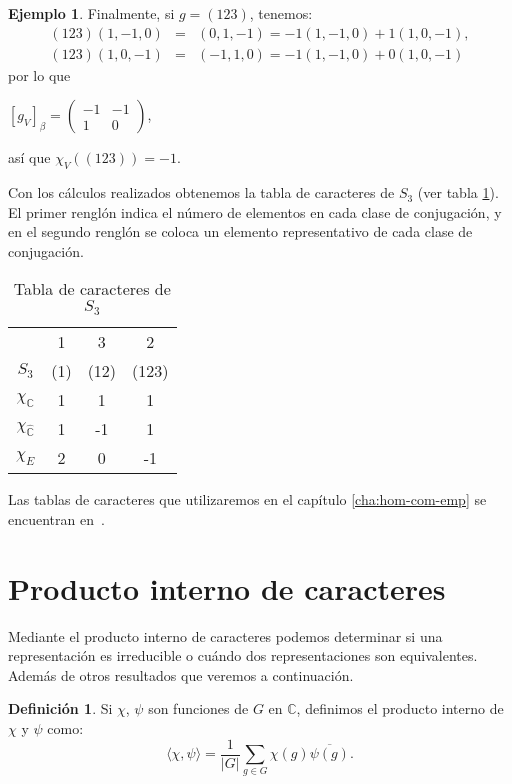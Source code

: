 \documentclass[12pt]{book}
\theoremstyle{definition}
\newtheorem{definition}[theorem]{Definición}
\newtheorem{example}[theorem]{Ejemplo}
\newcounter{in}
\newcounter{ini}
\begin{document}
\begin{example}
Finalmente, si $g=(123)$, tenemos:
\begin{eqnarray*}
  (123)(1,-1,0)&=&(0,1,-1)=-1(1,-1,0)+1(1,0,-1),\\
  (123)(1,0,-1)&=&(-1,1,0)=-1(1,-1,0)+0(1,0,-1)
\end{eqnarray*} 
por lo que 
\begin{center}
  $[g_{V}]_{\beta}=
  \begin{pmatrix}
    -1 & -1 \\
    1 & 0 
  \end{pmatrix}$,
\end{center}
así que $\chi_{V}((123))=-1$.

Con los cálculos realizados obtenemos la tabla de caracteres de
$S_{3}$ (ver tabla \ref{tabla-car-S3}). El primer renglón indica el
número de elementos en cada clase de conjugación, y en el segundo
renglón se coloca un elemento representativo de cada clase de
conjugación.
\begin{table}[htpb]
  \centering
  \begin{tabular}{ c| c c c}
      & 1 & 3 & 2 \\
      $S_{3}$ & (1) & (12) & (123) \\
      \hline
      $\chi_{\mathbb{C}}$ & 1 & 1 & 1 \\
      $\chi_{\mathbb{\hat C}}$ & 1 & -1 & 1 \\
      $\chi_{E}$ & 2 & 0 & -1 
    \end{tabular}
    
  \caption{Tabla de caracteres de $S_{3}$}
  \label{tabla-car-S3}
\end{table}

Las tablas de caracteres que utilizaremos en el capítulo
\ref{cha:hom-com-emp} se encuentran en~\cite{liebeck}.
\end{example}

\section{Producto interno de caracteres}
\label{producto-interno}


Mediante el producto interno de caracteres  podemos determinar si una
representación es irreducible o cuándo dos representaciones son
equivalentes. Además de otros resultados que veremos a continuación.
\begin{definition}
  Si $\chi$, $\psi$ son funciones de $G$ en $\mathbb{C}$, definimos el
  producto interno de $\chi$ y $\psi$ como:
  \begin{equation*}
    \langle\chi,\psi\rangle=\frac{1}{|G|}\sum_{g\in G}\chi(g)\overline{\psi(g)}.
  \end{equation*}
\end{definition}
\end{document}
